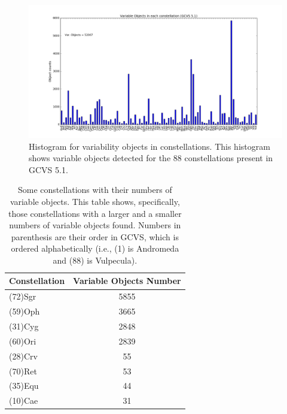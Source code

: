 \begin{enumerate} [a)]
\begin{figure}
\centering
\includegraphics[width=\linewidth, clip]{Histograma_constelaciones.png}
\caption{Histogram for variability objects in constellations. This histogram shows variable objects detected for the 88 constellations present in GCVS 5.1.}
\label{fig:F1}
\end{figure}

\begin{table}[ht]
\centering
\caption{\label{table:parameters} Some constellations with their numbers of variable objects. This table shows, specifically, those constellations with a larger and a smaller numbers of variable objects found. Numbers in parenthesis are their order in GCVS, which is ordered alphabetically (i.e., (1) is Andromeda and (88) is Vulpecula).}
\begin{tabular}{lc}
\hline
\hline
Constellation                          & Variable Objects Number        \\
\hline
(72)Sgr              &       5855 \\
(59)Oph           & 3665          \\
(31)Cyg           & 2848          \\
(60)Ori & 2839 \\
(28)Crv & 55 \\
(70)Ret & 53 \\
(35)Equ & 44 \\
(10)Cae & 31 \\
\hline
\end{tabular}
\end{table}




\end{enumerate}
